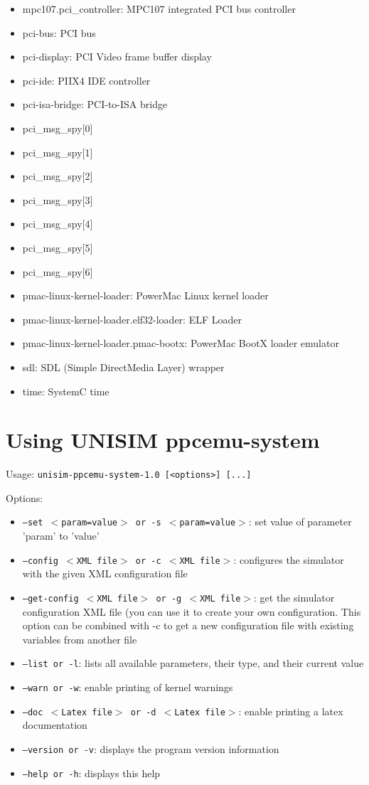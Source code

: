 \begin{itemize}
\item mpc107.pci\_controller: MPC107 integrated PCI bus controller
\item pci-bus: PCI bus
\item pci-display: PCI Video frame buffer display
\item pci-ide: PIIX4 IDE controller
\item pci-isa-bridge: PCI-to-ISA bridge
\item pci\_msg\_spy[0]
\item pci\_msg\_spy[1]
\item pci\_msg\_spy[2]
\item pci\_msg\_spy[3]
\item pci\_msg\_spy[4]
\item pci\_msg\_spy[5]
\item pci\_msg\_spy[6]
\item pmac-linux-kernel-loader: PowerMac Linux kernel loader
\item pmac-linux-kernel-loader.elf32-loader: ELF Loader
\item pmac-linux-kernel-loader.pmac-bootx: PowerMac BootX loader emulator
\item sdl: SDL (Simple DirectMedia Layer) wrapper
\item time: SystemC time
\end{itemize}
\section{Using UNISIM ppcemu-system}
\noindent Usage: \texttt{unisim-ppcemu-system-1.0 [<options>] [...]}

\noindent Options:
\begin{itemize}
\item \texttt{--set $<$param=value$>$ or -s $<$param=value$>$}: set value of parameter 'param' to 'value'
\item \texttt{--config $<$XML file$>$ or -c $<$XML file$>$}: configures the simulator with the given XML configuration file
\item \texttt{--get-config $<$XML file$>$ or -g $<$XML file$>$}: get the simulator configuration XML file (you can use it to create your own configuration. This option can be combined with -c to get a new configuration file with existing variables from another file
\item \texttt{--list or -l}: lists all available parameters, their type, and their current value
\item \texttt{--warn or -w}: enable printing of kernel warnings
\item \texttt{--doc $<$Latex file$>$ or -d $<$Latex file$>$}: enable printing a latex documentation
\item \texttt{--version or -v}: displays the program version information
\item \texttt{--help or -h}: displays this help
\end{itemize}
